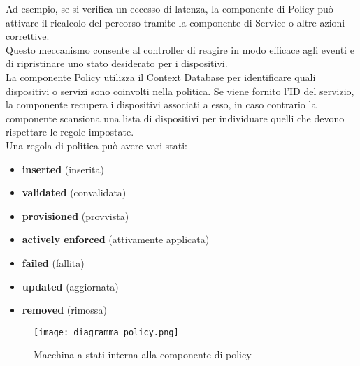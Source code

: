 Ad esempio, se si verifica un eccesso di latenza, la componente di Policy può attivare il ricalcolo del percorso tramite la componente di Service o altre azioni correttive.
\\Questo meccanismo consente al controller di reagire in modo efficace agli eventi e di ripristinare uno stato desiderato per i dispositivi.
\\La componente Policy utilizza il Context Database per identificare quali dispositivi o servizi sono coinvolti nella politica.
Se viene fornito l'ID del servizio, la componente recupera i dispositivi associati a esso, in caso contrario la componente scansiona una lista di dispositivi per individuare quelli che devono rispettare le regole impostate. 
\\Una regola di politica può avere vari stati:
\begin{itemize}
    \item \textbf{inserted} (inserita)
    \item \textbf{validated} (convalidata)
    \item \textbf{provisioned} (provvista)
    \item \textbf{actively enforced} (attivamente applicata)
    \item \textbf{failed} (fallita)
    \item \textbf{updated} (aggiornata)
    \item \textbf{removed} (rimossa)
\end{itemize}
\begin{figure}[h]
    \centering
   \texttt{[image: diagramma policy.png]}
    \caption{Macchina a stati interna alla componente di policy \cite{D32}}
    \label{fig:diagramma}
\end{figure}
